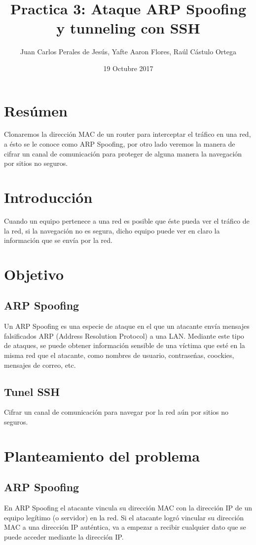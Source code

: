 \documentclass{article}
\title{Practica 3: Ataque ARP Spoofing y tunneling con SSH}
\author{Juan Carlos Perales de Jes\'us, Yafte Aaron Flores, Ra\'ul C\'astulo Ortega}
\date{19 Octubre 2017}
\begin{document}
\maketitle
\newpage

\section{Res\'umen}
Clonaremos la direcci\'on MAC de un router para interceptar el tr\'afico en una red, a \'esto se le conoce como ARP Spoofing, por otro lado veremos la manera de cifrar un canal de comunicaci\'on para proteger de alguna manera la navegaci\'on por sitios no seguros.
 
\section{Introducci\'on}
Cuando un equipo pertenece a una red es posible que \'este pueda ver el tr\'afico de la red, si la navegaci\'on no es segura, dicho equipo puede ver en claro la informaci\'on que se env\'ia por la red.
 
\section{Objetivo}
\subsection{ARP Spoofing}
Un ARP Spoofing es una especie de ataque en el que un atacante env\'ia mensajes falsificados ARP (Address Resolution Protocol) a una LAN.
Mediante este tipo de ataques, se puede obtener informaci\'on sensible de una v\'ictima que est\'e en la misma red que el atacante, como nombres de usuario, contrase\'nas, coockies, mensajes de correo, etc.
\subsection{Tunel SSH}
Cifrar un canal de comunicaci\'on para navegar por la red a\'un por sitios no seguros.

\section{Planteamiento del problema}
\subsection{ARP Spoofing}
En ARP Spoofing el atacante vincula su direcci\'on MAC con la direcci\'on IP de un equipo leg\'itimo (o servidor) en la red.
Si el atacante logró vincular su dirección MAC a una dirección IP auténtica, va a empezar a recibir cualquier dato que se puede acceder mediante la dirección IP.
\end{document}
